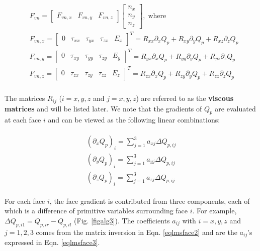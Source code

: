 \documentclass[12pt, letterpaper]{report}
\begin{document}
\begin{align}\label{eqFvnRij}
   \begin{split}
      &F_{vn} = \begin{bmatrix}F_{vn,x} & F_{vn,y} & F_{vn,z}\end{bmatrix}
      \begin{bmatrix}n_x \\ n_y \\ n_z\end{bmatrix}, \; \textrm{where} \\
      &F_{vn,x} = \begin{bmatrix}0 & \tau_{xx} & \tau_{yx} &\tau_{zx} & E_x\end{bmatrix}^T =
      R_{xx}\partial_x Q_p + R_{xy}\partial_y Q_p + R_{xz} \partial_z Q_p \\
      &F_{vn,y} = \begin{bmatrix}0 & \tau_{xy} & \tau_{yy} &\tau_{zy} & E_y\end{bmatrix}^T =
      R_{yx}\partial_x Q_p + R_{yy}\partial_y Q_p + R_{yz} \partial_z Q_p \\
      &F_{vn,z} = \begin{bmatrix}0 & \tau_{zx} & \tau_{zy} &\tau_{zz} & E_z\end{bmatrix}^T =
      R_{zx}\partial_x Q_p + R_{zy}\partial_y Q_p + R_{zz} \partial_z Q_p \\
   \end{split}
\end{align}

The matrices $R_{ij}$ ($i = x, y, z$ and $j = x, y, z$) are referred to as the {\bf viscous
matrices} and will be listed later. We note that the gradients of $Q_p$ are evaluated at each face
$i$ and can be viewed as the following linear combinations:

\begin{align}\label{eqGradLinear}
   \begin{split}
      (\partial_x Q_p)_i = \sum_{j = 1}^3 a_{xj} \Delta Q_{p,ij} \\
      (\partial_y Q_p)_i = \sum_{j = 1}^3 a_{yj} \Delta Q_{p,ij} \\
      (\partial_z Q_p)_i = \sum_{j = 1}^3 a_{zj} \Delta Q_{p,ij}
   \end{split}
\end{align}

For each face $i$, the face gradient is contributed from three components, each of which is a
difference of primitive variables surrounding face $i$. For example, $\Delta Q_{p,i1} = Q_{p,ir} -
Q_{p,il}$ (Fig. \ref{figalg3}). The coefficients $a_{ij}$ with $i = x, y, z$ and $j = 1, 2, 3$ comes
from the matrix inversion in Eqn. \ref{eqlmsface2} and are the $a_{ij}$'s expressed in Eqn.
\ref{eqlmsface3}. \paraspace
\end{document}
